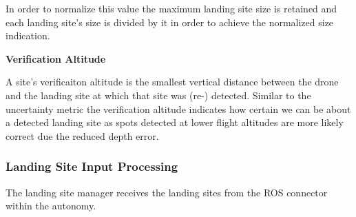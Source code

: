 In order to normalize this value the maximum landing site size is retained and each landing site's size is divided by it in order to achieve the normalized size indication.

\textbf{Verification Altitude}

A site's verificaiton altitude is the smallest vertical distance between the drone and the landing site at which that site was (re-) detected. Similar to the uncertainty metric the verification altitude indicates how certain we can be about a detected landing site as spots detected at lower flight altitudes are more likely correct due the reduced depth error. 

\subsubsection{Landing Site Input Processing}
The landing site manager receives the landing sites from the ROS connector within the autonomy. 

\subsubsection{}

